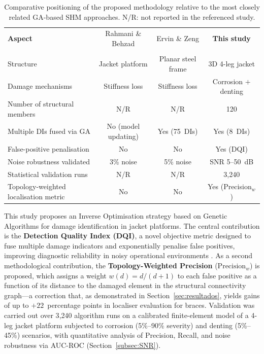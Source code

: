 \documentclass[a4paper,fleqn,nologo]{cas-dc}
\begin{document}
\begin{table}[!ht]
  \centering
  \small
  \caption{Comparative positioning of the proposed methodology relative to the most closely related GA-based SHM approaches. N/R: not reported in the referenced study.}
  \label{tab:comparison_sota}
  \begin{tabular}{lccc}
    \toprule
    \textbf{Aspect} & Rahmani \& Behzad & Ervin \& Zeng & \textbf{This study} \\
                    & \citep{rahmani2013ga} & \citep{ervin2022index} & \\
    \midrule
    Structure                            & Jacket platform        & Planar steel frame     & 3D 4-leg jacket        \\
    Damage mechanisms                    & Stiffness loss         & Stiffness loss         & Corrosion $+$ denting  \\
    Number of structural members         & N/R                    & N/R                    & 120                    \\
    Multiple DIs fused via GA            & No (model updating)    & Yes (75~DIs)           & Yes (8~DIs)            \\
    False-positive penalisation          & No                     & No                     & Yes (DQI)              \\
    Noise robustness validated           & 3\% noise              & 5\% noise              & SNR 5--50~dB           \\
    Statistical validation runs          & N/R                    & N/R                    & 3{,}240                \\
    Topology-weighted localisation metric& No                     & No                     & Yes (Precision$_w$)    \\
    \bottomrule
  \end{tabular}
\end{table}

This study proposes an Inverse Optimisation strategy based on Genetic Algorithms for damage identification in jacket platforms. The central contribution is the \textbf{Detection Quality Index (DQI)}, a novel objective metric designed to fuse multiple damage indicators and exponentially penalise false positives, improving diagnostic reliability in noisy operational environments \citep{malekzadeh2013damage}. As a second methodological contribution, the \textbf{Topology-Weighted Precision} ($\text{Precision}_w$) is proposed, which assigns a weight $w(d) = d/(d+1)$ to each false positive as a function of its distance to the damaged element in the structural connectivity graph---a correction that, as demonstrated in Section~\ref{sec:resultados}, yields gains of up to $+22$~percentage points in localiser evaluation for braces. Validation was carried out over 3{,}240 algorithm runs on a calibrated finite-element model of a 4-leg jacket platform subjected to corrosion (5\%--90\% severity) and denting (5\%--45\%) scenarios, with quantitative analysis of Precision, Recall, and noise robustness via AUC-ROC (Section~\ref{subsec:SNR}).
\end{document}
